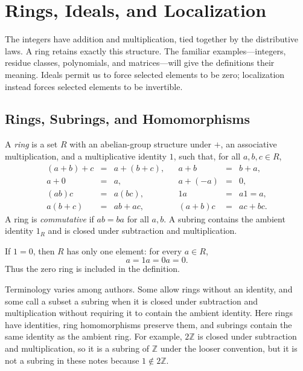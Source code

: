 \chapter{Rings, Ideals, and Localization}

The integers have addition and multiplication, tied together by the distributive
laws. A ring retains exactly this structure. The familiar examples---integers,
residue classes, polynomials, and matrices---will give the definitions their
meaning. Ideals permit us to force selected elements to be zero; localization
instead forces selected elements to be invertible.

\section{Rings, Subrings, and Homomorphisms}
\begin{definition}
A \emph{ring} is a set \(R\) with an abelian-group structure under \(+\),
an associative multiplication, and a multiplicative identity \(1\), such
that, for all \(a,b,c\in R\),
\[
\begin{array}{rclcrcl}
(a+b)+c&=&a+(b+c),&&a+b&=&b+a,\\
a+0&=&a,&&a+(-a)&=&0,\\
(ab)c&=&a(bc),&&1a&=&a1=a,\\
a(b+c)&=&ab+ac,&&(a+b)c&=&ac+bc.
\end{array}
\]
A ring is \emph{commutative} if \(ab=ba\) for all \(a,b\). A subring
contains the ambient identity \(1_R\) and is closed under subtraction and
multiplication.
\end{definition}

If \(1=0\), then \(R\) has only one element: for every \(a\in R\),
\[
a=1a=0a=0.
\]
Thus the zero ring is included in the definition.

\begin{unremark}
Terminology varies among authors.  Some allow rings without an identity,
and some call a subset a subring when it is closed under subtraction and
multiplication without requiring it to contain the ambient identity.  Here
rings have identities, ring homomorphisms preserve them, and subrings contain
the same identity as the ambient ring.  For example, \(2\mathbb Z\) is
closed under subtraction and multiplication, so it is a subring of
\(\mathbb Z\) under the looser convention, but it is not a subring in these
notes because \(1\notin2\mathbb Z\).
\end{unremark}

